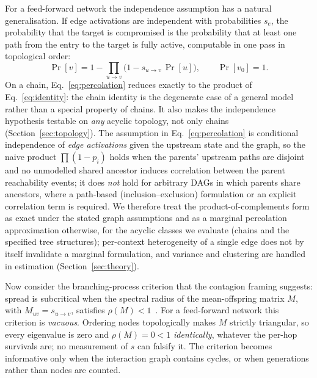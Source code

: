 \documentclass[sigconf,anonymous]{aamas}
\begin{document}
For a feed-forward network the independence assumption has a natural
generalisation. If edge activations are independent with probabilities $s_e$, the
probability that the target is compromised is the probability that at least one
path from the entry to the target is fully active, computable in one pass in
topological order:
\begin{equation}
\Pr[v] = 1 - \prod_{u \to v} \bigl(1 - s_{u\to v}\,\Pr[u]\bigr),
\qquad \Pr[v_0] = 1 .
\label{eq:percolation}
\end{equation}
On a chain, Eq.~\eqref{eq:percolation} reduces exactly to the product of
Eq.~\eqref{eq:identity}: the chain identity is the degenerate case of a general
model rather than a special property of chains. It also makes the independence
hypothesis testable on \emph{any} acyclic topology, not only chains
(Section~\ref{sec:topology}). The assumption in Eq.~\eqref{eq:percolation} is
conditional independence of \emph{edge activations} given the upstream state and the
graph, so the naive product $\prod(1-p_i)$ holds when the parents' upstream paths are
disjoint and no unmodelled shared ancestor induces correlation between the parent
reachability events; it does \emph{not} hold for arbitrary DAGs in which parents
share ancestors, where a path-based (inclusion--exclusion) formulation or an explicit
correlation term is required. We therefore treat the product-of-complements form as
exact under the stated graph assumptions and as a marginal percolation approximation
otherwise, for the acyclic classes we evaluate (chains and the specified tree
structures); per-context heterogeneity of a single edge does not by itself
invalidate a marginal formulation, and variance and clustering are handled in
estimation (Section~\ref{sec:theory}).

Now consider the branching-process criterion that the contagion framing suggests:
spread is subcritical when the spectral radius of the mean-offspring matrix $M$,
with $M_{uv} = s_{u\to v}$, satisfies $\rho(M) < 1$~\cite{PastorSatorras2001}. For
a feed-forward network this criterion is \emph{vacuous}. Ordering nodes
topologically makes $M$ strictly triangular, so every eigenvalue is zero and
$\rho(M) = 0 < 1$ \emph{identically}, whatever the per-hop survivals are; no
measurement of $s$ can falsify it. The criterion becomes informative only when the
interaction graph contains cycles, or when generations rather than nodes are
counted.
\end{document}
